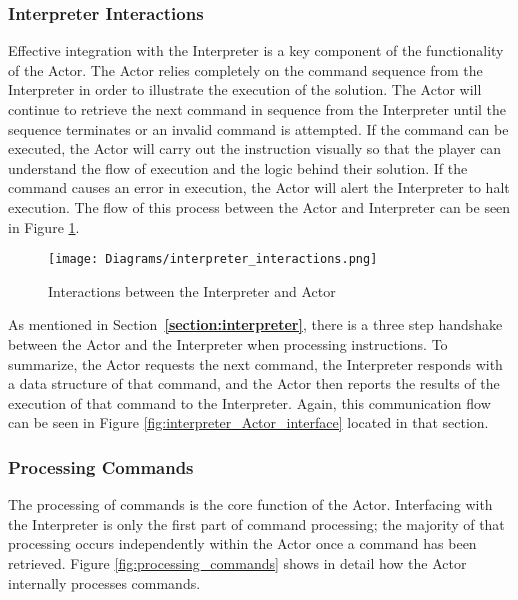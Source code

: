\subsubsection{Interpreter Interactions}
Effective integration with the Interpreter is a key component of the functionality of the 
Actor. The Actor relies completely on the command sequence from the Interpreter in 
order to illustrate the execution of the solution. The Actor will continue to retrieve the 
next command in sequence from the Interpreter until the sequence terminates or an 
invalid command is attempted. If the command can be executed, the Actor will carry 
out the instruction visually so that the player can understand the flow of execution and 
the logic behind their solution. If the command causes an error in execution, the Actor 
will alert the Interpreter to halt execution. The flow of this process between the Actor 
and Interpreter can be seen in Figure \ref{fig:interpreter_interactions}.\\

\begin{figure}[!htb]
  \caption{Interactions between the Interpreter and Actor}
  \label{fig:interpreter_interactions}
  \centering
  \texttt{[image: Diagrams/interpreter\_interactions.png]}
\end{figure}

As mentioned in Section~\textbf{\ref{section:interpreter}}, there is a three step handshake 
between the Actor and the Interpreter when processing instructions. To summarize, the 
Actor requests the next command, the Interpreter responds with a data structure of that 
command, and the Actor then reports the results of the execution of that command to the 
Interpreter. Again, this communication flow can be seen in 
Figure \ref{fig:interpreter_Actor_interface} located in that section.\\

\newpage
\subsubsection{Processing Commands}
The processing of commands is the core function of the Actor. Interfacing with the Interpreter 
is only the first part of command processing; the majority of that processing occurs independently 
within the Actor once a command has been retrieved. Figure \ref{fig:processing_commands} 
shows in detail how the Actor internally processes commands.\\

